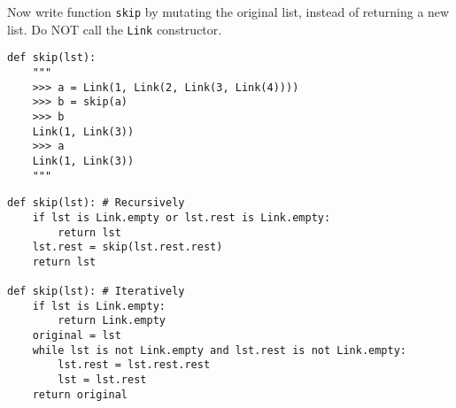\begin{blocksection}
\question Now write function \texttt{skip} by mutating the original list, instead of returning a new list. Do NOT call the \texttt{Link} constructor.

\begin{lstlisting}
def skip(lst):
    """
    >>> a = Link(1, Link(2, Link(3, Link(4))))
    >>> b = skip(a)
    >>> b
    Link(1, Link(3))
    >>> a
    Link(1, Link(3))
    """
\end{lstlisting}

\begin{solution}[1in]
\begin{lstlisting}
def skip(lst): # Recursively
    if lst is Link.empty or lst.rest is Link.empty:
        return lst
    lst.rest = skip(lst.rest.rest)
    return lst

def skip(lst): # Iteratively
    if lst is Link.empty:
        return Link.empty
    original = lst
    while lst is not Link.empty and lst.rest is not Link.empty:
        lst.rest = lst.rest.rest
        lst = lst.rest
    return original
\end{lstlisting}
\end{solution}

\end{blocksection}
